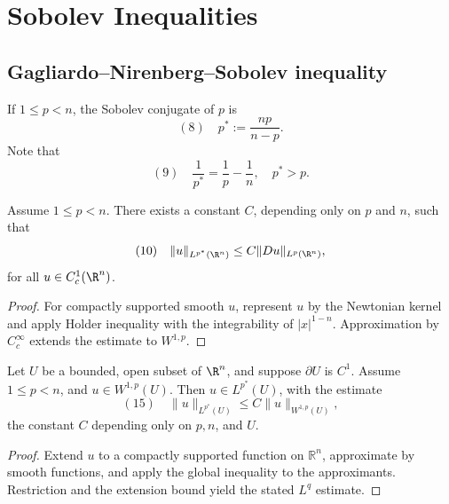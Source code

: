 \section{Sobolev Inequalities}
\label{sec:sobolev-inequalities}

\subsection{Gagliardo--Nirenberg--Sobolev inequality}

\begin{definition}
\label{def:sobolev-conjugate-exponent}
If $1 \le p < n$, the Sobolev conjugate of $p$ is
$$(8) \quad p^* := \frac{np}{n - p}.$$
Note that
$$(9) \quad \frac{1}{p^*} = \frac{1}{p} - \frac{1}{n}, \quad p^* > p.$$
\end{definition}

\begin{theorem}
\label{thm:gagliardo-nirenberg-sobolev-inequality}
Assume $1 \le p < n$. There exists a constant $C$, depending only on $p$ and $n$, such that
$$(10) \quad \|u\|_{L^{p^*}(\R^n)} \le C\|Du\|_{L^p(\R^n)},$$
for all $u \in C_c^1(\R^n)$.
\end{theorem}

\begin{proof}
\sketch For compactly supported smooth $u$, represent $u$ by the Newtonian kernel and apply Holder inequality with the integrability of $|x|^{1-n}$. Approximation by $C_c^\infty$ extends the estimate to $W^{1,p}$.
\end{proof}

\begin{theorem}
\label{thm:sobolev-embedding-w1p-subcritical}
Let $U$ be a bounded, open subset of $\R^n$, and suppose $\partial U$ is $C^1$. Assume $1 \le p < n$, and $u \in W^{1,p}(U)$. Then $u \in L^{p^*}(U)$, with the estimate
$$(15) \quad \|u\|_{L^{p^*}(U)} \le C\|u\|_{W^{1,p}(U)},$$
the constant $C$ depending only on $p, n$, and $U$.
\end{theorem}

\begin{proof}
\sketch Extend $u$ to a compactly supported function on $\mathbb R^n$, approximate by smooth functions, and apply the global inequality to the approximants. Restriction and the extension bound yield the stated $L^q$ estimate.
\end{proof}


